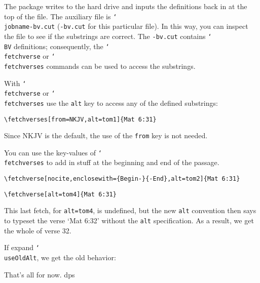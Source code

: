 \documentclass{article}
\def\cs#1{\texttt{\char`\\#1}}
\begin{document}
The package writes to the hard drive and inputs the definitions back in at
the top of the file. The auxiliary file is \cs{jobname-bv.cut}
(\texttt{\jobname-bv.cut} for this particular file). In this way, you can
inspect the file to see if the substrings are correct. The
\texttt{\jobname-bv.cut} contains \cs{BV} definitions; consequently, the
\cs{fetchverse} or \cs{fetchverses} commands can be used to access the
substrings.

With \cs{fetchverse} or \cs{fetchverses} use the \texttt{alt} key to access
any of the defined substrings:

\verb~\fetchverses[from=NKJV,alt=tom1]{Mat 6:31}~\\[3pt]

Since NKJV is the default, the use of the \texttt{from} key is not needed.

You can use the key-values of \cs{fetchverses} to add in stuff at the
beginning and end of the passage.

\verb~\fetchverse[nocite,enclosewith={Begin-}{-End},alt=tom2]{Mat 6:31}~\\[3pt]

\verb~\fetchverse[alt=tom4]{Mat 6:31}~\\[3pt]

This last fetch, for \texttt{alt=tom4}, is undefined, but the new \texttt{alt} convention
then says to typeset the verse `Mat 6:32' without the \texttt{alt} specification. As a
result, we get the whole of verse 32.

If expand \cs{useOldAlt}, we get the old behavior:\\[3pt]\useOldAlt
{}\useNewAlt

That's all for now. dps
\end{document}
